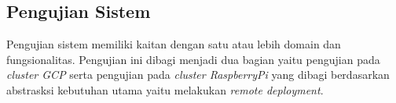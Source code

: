 \subsection{Pengujian Sistem}
Pengujian sistem memiliki kaitan dengan satu atau lebih domain dan fungsionalitas. Pengujian ini dibagi menjadi dua bagian yaitu pengujian pada \textit{cluster GCP} serta pengujian pada \textit{cluster RaspberryPi} yang dibagi berdasarkan abstrasksi kebutuhan utama yaitu melakukan \textit{remote deployment}.



